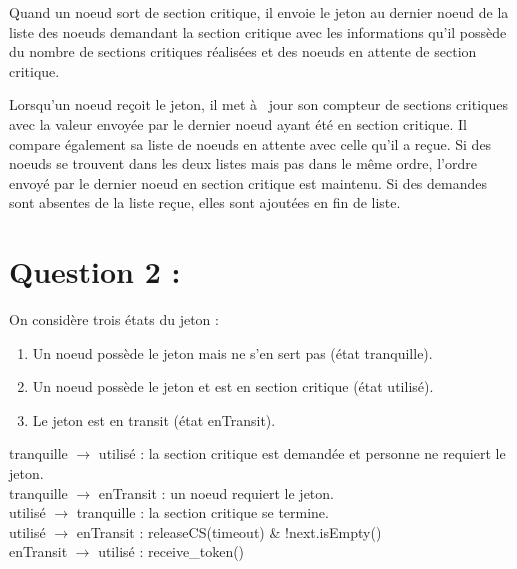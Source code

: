 \documentclass[11pt,a4paper]{report}
\begin{document}
Quand un noeud sort de section critique, il envoie le jeton au dernier noeud de la liste des noeuds demandant la section critique avec les informations qu'il possède du nombre de sections critiques réalisées et des noeuds en attente de section critique.

Lorsqu'un noeud reçoit le jeton, il met à  jour son compteur de sections critiques avec la valeur envoyée par le dernier noeud ayant été en section critique. Il compare également sa liste de noeuds en attente avec celle qu'il a reçue. Si des noeuds se trouvent dans les deux listes mais pas dans le même ordre, l'ordre envoyé par le dernier noeud en section critique est maintenu. Si des demandes sont absentes de la liste reçue, elles sont ajoutées en fin de liste.


\section{Question 2 :}

On considère trois états du jeton :
\begin{enumerate}
	\item Un noeud possède le jeton mais ne s'en sert pas (état tranquille).
	\item Un noeud possède le jeton et est en section critique (état utilisé).
	\item Le jeton est en transit (état enTransit).
\end{enumerate}
tranquille $\rightarrow$ utilisé : la section critique est demandée et personne ne requiert le jeton.\\
tranquille $\rightarrow$ enTransit : un noeud requiert le jeton.\\
utilisé $\rightarrow$ tranquille : la section critique se termine.\\
utilisé $\rightarrow$ enTransit : releaseCS(timeout) \& !next.isEmpty()\\
enTransit $\rightarrow$ utilisé : receive\_token()\\
\end{document}

